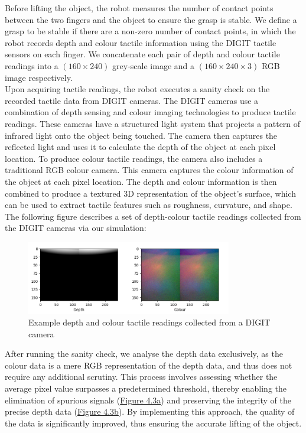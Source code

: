 \documentclass[11pt, a4paper]{report}
\begin{document}
Before lifting the object, the robot measures the number of contact points between the two fingers and the object to ensure the grasp is stable. We define a grasp to be stable if there are a non-zero number of contact points, in which the robot records depth and colour tactile information using the DIGIT \cite{Lambeta2020DIGIT} tactile sensors on each finger. We concatenate each pair of depth and colour tactile readings into a $(160\times240)$ grey-scale image and a $(160\times240\times3)$ RGB image respectively.\\

\newpage
Upon acquiring tactile readings, the robot executes a sanity check on the recorded tactile data from DIGIT cameras. The DIGIT cameras use a combination of depth sensing and colour imaging technologies to produce tactile readings. These cameras have a structured light system that projects a pattern of infrared light onto the object being touched. The camera then captures the reflected light and uses it to calculate the depth of the object at each pixel location. To produce colour tactile readings, the camera also includes a traditional RGB colour camera. This camera captures the colour information of the object at each pixel location. The depth and colour information is then combined to produce a textured 3D representation of the object's surface, which can be used to extract tactile features such as roughness, curvature, and shape. The following figure describes a set of depth-colour tactile readings collected from the DIGIT cameras via our simulation:
\begin{figure}[H]
    \centering
    \includegraphics[width=0.8\textwidth]{docs/Project Report/Media/4_2_tactile_data_visualisation.png}
    \caption{Example depth and colour tactile readings collected from a DIGIT camera}
    \label{fig:4.2}
\end{figure}


After running the sanity check, we analyse the depth data exclusively, as the colour data is a mere RGB representation of the depth data, and thus does not require any additional scrutiny. This process involves assessing whether the average pixel value surpasses a predetermined threshold, thereby enabling the elimination of spurious signals (\hyperref[fig:4.3a]{Figure 4.3a}) and preserving the integrity of the precise depth data (\hyperref[fig:4.3b]{Figure 4.3b}). By implementing this approach, the quality of the data is significantly improved, thus ensuring the accurate lifting of the object.
\end{document}
